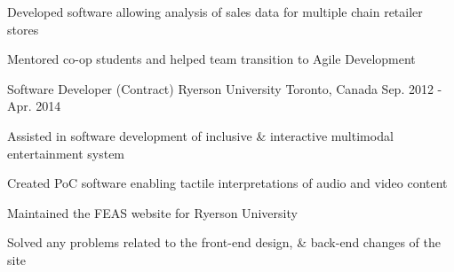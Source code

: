 \begin{cventries}
{\begin{cvitems}
        \item {Developed software allowing analysis of sales data for multiple chain retailer stores}
        \item {Mentored co-op students and helped team transition to Agile Development}
      \end{cvitems}
    }
  \cventry
    {Software Developer (Contract)}
    {Ryerson University}
    {Toronto, Canada}
    {Sep. 2012 - Apr. 2014}
    {
      \begin{cvitems}
        \item {Assisted in software development of inclusive \& interactive multimodal entertainment system}
        \item {Created PoC software enabling tactile interpretations of audio and video content}
        \item {Maintained the FEAS website for Ryerson University}
        \item {Solved any problems related to the front-end design, \& back-end changes of the site}
      \end{cvitems}
    }
\end{cventries}